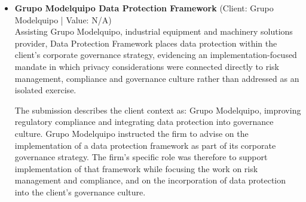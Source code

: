 \documentclass[11pt]{article}
\begin{document}
\begin{itemize}
Arturo González de Araujo, Ernesto Zavala and Damián Ortega led the work for Grupo Excelsior. Their specific role extended beyond identifying the data-protection focus of the restructuring: the firm designed and implemented internal policies and training programmes. The mandate therefore combined the regularisation of operations, the restructuring of those operations, the creation and implementation of internal policies, and training programmes intended to support the application of the new internal arrangements.

The stated outcome was the design and implementation of internal policies and training programmes in connection with the regularisation and restructuring of operations focusing on data protection. For Grupo Excelsior, these measures, significantly strengthening compliance posture and reducing regulatory exposure, constituted the concrete result of the engagement. The matter evidences a data-protection regularisation exercise in which Arturo González de Araujo, Ernesto Zavala and Damián Ortega translated the client’s operational restructuring requirements into implemented internal policies and training programmes.
\item \textbf{Grupo Modelquipo Data Protection Framework} (Client: Grupo Modelquipo | Value: N/A)\\ Assisting Grupo Modelquipo, industrial equipment and machinery solutions provider, Data Protection Framework places data protection within the client’s corporate governance strategy, evidencing an implementation-focused mandate in which privacy considerations were connected directly to risk management, compliance and governance culture rather than addressed as an isolated exercise.

The submission describes the client context as: Grupo Modelquipo, improving regulatory compliance and integrating data protection into governance culture. Grupo Modelquipo instructed the firm to advise on the implementation of a data protection framework as part of its corporate governance strategy. The firm’s specific role was therefore to support implementation of that framework while focusing the work on risk management and compliance, and on the incorporation of data protection into the client’s governance culture.


\end{itemize}
\end{document}
